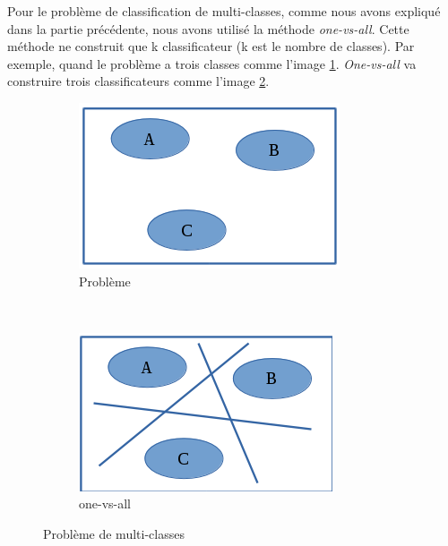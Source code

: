 Pour le problème de classification de multi-classes, comme nous avons expliqué dans la partie précédente, nous avons utilisé la méthode \textit{one-vs-all}. Cette méthode ne construit que k classificateur (k est le nombre de classes). Par exemple, quand le problème a trois classes comme l'image \ref{mclass}. \textit{One-vs-all} va construire trois classificateurs comme l'image \ref{1vsall}.

\pagebreak
\begin{figure}
        \centering
        \begin{subfigure}[b]{0.5\textwidth}
                \includegraphics[width=\textwidth]{images/multiclass}
                \caption{Problème}
                \label{mclass}
        \end{subfigure}%
        ~ %
        \begin{subfigure}[b]{0.5\textwidth}
                \includegraphics[width=\textwidth]{images/mlclass}
                \caption{one-vs-all}
                \label{1vsall}
        \end{subfigure}
        \caption{Problème de multi-classes}\label{mulclass}
\end{figure}


